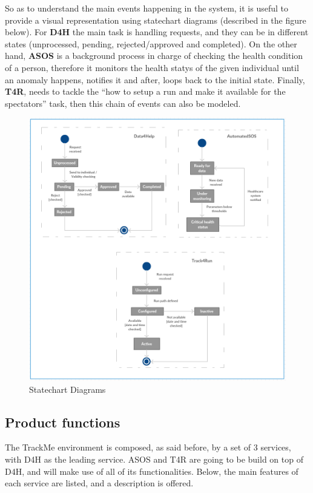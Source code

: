 \documentclass[12pt]{article}
\begin{document}
So as to understand the main events happening in the system, it is useful to provide a visual representation using statechart diagrams (described in the figure below). For \textbf {D4H} the main task is handling requests, and they can be in different states (unprocessed, pending, rejected/approved and completed). On the other hand, \textbf {ASOS} is a background process in charge of checking the health condition of a person, therefore it monitors the health statys of the given individual until an anomaly happens, notifies it and after, loops back to the initial state. Finally, \textbf {T4R}, needs to tackle the “how to setup a run and make it available for the spectators” task, then this chain of events can also be modeled.

 \begin{figure}[H]
\centering
 \includegraphics[scale=0.7]{Diagrams/statechart_diagrams.png}
\caption[Statechart Diagrams]{Statechart Diagrams}
\label{fig:Statechart_diagram}
\end{figure}

\subsection{Product functions}
The TrackMe environment is composed, as said before, by a set of 3 services, with D4H as the leading service. ASOS and T4R are going to be build on top of D4H, and will make use of all of its functionalities. Below, the main features of each service are listed, and a description is offered.
\end{document}

